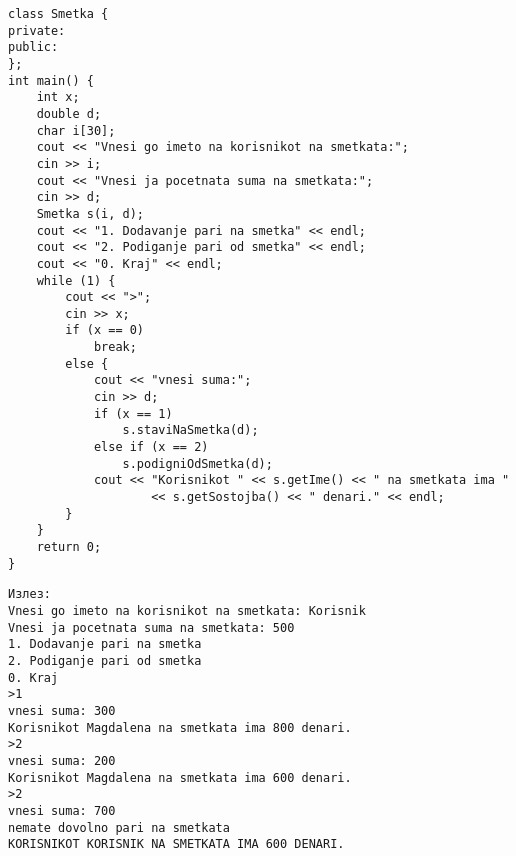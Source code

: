 \documentclass[12pt,a4paper]{exam}
\begin{document}
\begin{questions}
\begin{lstlisting}
class Smetka {
private:
public:
};
int main() {
    int x;
    double d;
    char i[30];
    cout << "Vnesi go imeto na korisnikot na smetkata:";
    cin >> i;
    cout << "Vnesi ja pocetnata suma na smetkata:";
    cin >> d;
    Smetka s(i, d);
    cout << "1. Dodavanje pari na smetka" << endl;
    cout << "2. Podiganje pari od smetka" << endl;
    cout << "0. Kraj" << endl;
    while (1) {
        cout << ">";
        cin >> x;
        if (x == 0)
            break;
        else {
            cout << "vnesi suma:";
            cin >> d;
            if (x == 1)
                s.staviNaSmetka(d);
            else if (x == 2)
                s.podigniOdSmetka(d);
            cout << "Korisnikot " << s.getIme() << " na smetkata ima "
                    << s.getSostojba() << " denari." << endl;
        }
    }
    return 0;
}
\end{lstlisting}
\begin{verbatim}
Излез:
Vnesi go imeto na korisnikot na smetkata: Korisnik
Vnesi ja pocetnata suma na smetkata: 500
1. Dodavanje pari na smetka
2. Podiganje pari od smetka
0. Kraj
>1
vnesi suma: 300
Korisnikot Magdalena na smetkata ima 800 denari.
>2
vnesi suma: 200
Korisnikot Magdalena na smetkata ima 600 denari.
>2
vnesi suma: 700
nemate dovolno pari na smetkata
KORISNIKOT KORISNIK NA SMETKATA IMA 600 DENARI.
\end{verbatim}



\end{questions}
\end{document}

